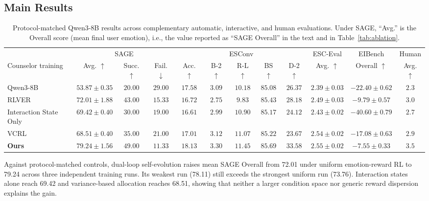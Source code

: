 \documentclass[letterpaper]{article}
\begin{document}
\subsection{Main Results}
\begin{table}[t]
\centering
\small
\setlength{\tabcolsep}{1.6pt}
\begin{tabular}{lccccccccccc}
\toprule
& \multicolumn{3}{c}{SAGE} & \multicolumn{5}{c}{ESConv} & \multicolumn{1}{c}{ESC-Eval} & \multicolumn{1}{c}{EIBench} & \multicolumn{1}{c}{Human}\\
\cmidrule(lr){2-4}\cmidrule(lr){5-9}\cmidrule(lr){10-10}\cmidrule(lr){11-11}\cmidrule(lr){12-12}
Counselor training
& Avg. $\uparrow$ & Succ. $\uparrow$ & Fail. $\downarrow$
& Acc. $\uparrow$ & B-2 $\uparrow$ & R-L $\uparrow$ & BS $\uparrow$ & D-2 $\uparrow$
& Avg. $\uparrow$ & Overall $\uparrow$ & Avg. $\uparrow$\\
\midrule
Qwen3-8B
& $53.87\pm0.35$ & $20.00$ & $29.00$
& $17.58$ & $3.09$ & $10.18$ & $85.08$ & $26.37$
& $2.39\pm0.03$
& $-22.40\pm0.62$
& $2.3$\\
RLVER
& $72.01\pm1.88$ & $43.00$ & $15.33$
& $16.72$ & $2.75$ & $9.83$ & $85.43$ & $28.18$
& $2.49\pm0.03$
& $-9.79\pm0.57$
& $3.0$\\
Interaction State Only
& $69.42\pm0.40$ & $30.00$ & $19.00$
& $16.61$ & $2.99$ & $10.90$ & $85.17$ & $24.12$
& $2.43\pm0.02$
& $-40.60\pm0.79$
& $2.7$\\
VCRL
& $68.51\pm0.40$ & $35.00$ & $21.00$
& $17.01$ & $3.12$ & $11.07$ & $85.22$ & $23.67$
& $2.54\pm0.02$
& $-17.08\pm0.63$
& $2.9$\\
\textbf{Ours}
& $\mathbf{79.24\pm1.56}$ & $\mathbf{49.00}$ & $\mathbf{11.33}$
& $\mathbf{18.13}$ & $\mathbf{3.30}$ & $\mathbf{11.45}$ & $\mathbf{85.69}$ & $\mathbf{33.58}$
& $\mathbf{2.55\pm0.02}$
& $\mathbf{-7.55\pm0.33}$
& $\mathbf{3.5}$\\
\bottomrule
\end{tabular}
\caption{Protocol-matched Qwen3-8B results across complementary automatic, interactive, and human evaluations. Under SAGE, ``Avg.'' is the Overall score (mean final user emotion), i.e., the value reported as ``SAGE Overall'' in the text and in Table~\ref{tab:ablation}.}
\label{tab:main-results}
\end{table}

Against protocol-matched controls, dual-loop self-evolution raises mean SAGE Overall from 72.01 under uniform emotion-reward RL to 79.24 across three independent training runs. Its weakest run (78.11) still exceeds the strongest uniform run (73.76). Interaction states alone reach 69.42 and variance-based allocation reaches 68.51, showing that neither a larger condition space nor generic reward dispersion explains the gain.
\end{document}
